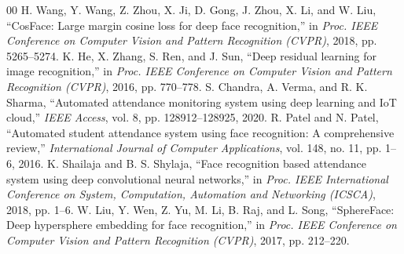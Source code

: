 \documentclass[conference]{IEEEtran}
\begin{document}
\begin{thebibliography}{00}
 H. Wang, Y. Wang, Z. Zhou, X. Ji, D. Gong, J. Zhou, X. Li, and W. Liu, ``CosFace: Large margin cosine loss for deep face recognition,'' in \textit{Proc. IEEE Conference on Computer Vision and Pattern Recognition (CVPR)}, 2018, pp. 5265--5274.
 K. He, X. Zhang, S. Ren, and J. Sun, ``Deep residual learning for image recognition,'' in \textit{Proc. IEEE Conference on Computer Vision and Pattern Recognition (CVPR)}, 2016, pp. 770--778.
 S. Chandra, A. Verma, and R. K. Sharma, ``Automated attendance monitoring system using deep learning and IoT cloud,'' \textit{IEEE Access}, vol. 8, pp. 128912--128925, 2020.
 R. Patel and N. Patel, ``Automated student attendance system using face recognition: A comprehensive review,'' \textit{International Journal of Computer Applications}, vol. 148, no. 11, pp. 1--6, 2016.
 K. Shailaja and B. S. Shylaja, ``Face recognition based attendance system using deep convolutional neural networks,'' in \textit{Proc. IEEE International Conference on System, Computation, Automation and Networking (ICSCA)}, 2018, pp. 1--6.
 W. Liu, Y. Wen, Z. Yu, M. Li, B. Raj, and L. Song, ``SphereFace: Deep hypersphere embedding for face recognition,'' in \textit{Proc. IEEE Conference on Computer Vision and Pattern Recognition (CVPR)}, 2017, pp. 212--220.
\end{thebibliography}
\end{document}
